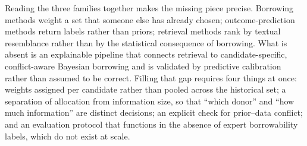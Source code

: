 \documentclass[11pt]{article}
\begin{document}
Reading the three families together makes the missing piece precise. Borrowing
methods weight a set that someone else has already chosen; outcome-prediction
methods return labels rather than priors; retrieval methods rank by textual
resemblance rather than by the statistical consequence of borrowing. What is
absent is an explainable pipeline that connects retrieval to candidate-specific,
conflict-aware Bayesian borrowing and is validated by predictive calibration
rather than assumed to be correct. Filling that gap requires four things at
once: weights assigned per candidate rather than pooled across the historical
set; a separation of allocation from information size, so that ``which donor''
and ``how much information'' are distinct decisions; an explicit check for
prior--data conflict; and an evaluation protocol that functions in the absence
of expert borrowability labels, which do not exist at scale.
\end{document}
